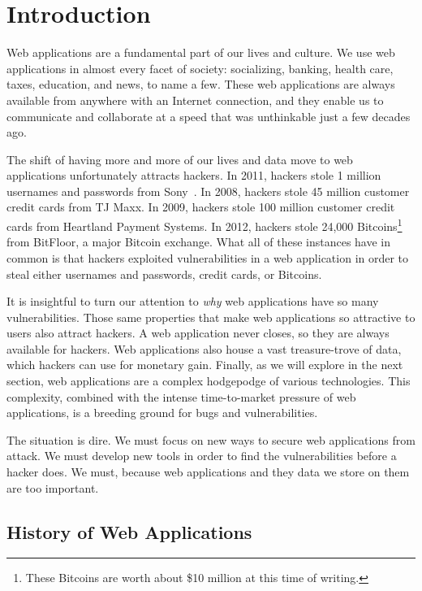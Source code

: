 %
%

\chapter{Introduction}

Web applications are a fundamental part of our lives and culture. We
use web applications in almost every facet of society: socializing,
banking, health care, taxes, education, and news, to name a few. These
web applications are always available from anywhere with an Internet
connection, and they enable us to communicate and collaborate at a
speed that was unthinkable just a few decades ago.

The shift of having more and more of our lives and data move to web
applications unfortunately attracts hackers. In 2011, hackers stole 1
million usernames and passwords from Sony~\cite{bilton11:sony}. In
2008, hackers stole 45 million customer credit cards from TJ Maxx. In
2009, hackers stole 100 million customer credit cards from Heartland
Payment Systems. In 2012, hackers stole 24,000 Bitcoins\footnote{These
  Bitcoins are worth about \$10 million at this time of writing.} from
BitFloor, a major Bitcoin exchange. What all of these instances have
in common is that hackers exploited vulnerabilities in a web
application in order to steal either usernames and passwords, credit
cards, or Bitcoins.

It is insightful to turn our attention to \emph{why} web applications
have so many vulnerabilities. Those same properties that make web
applications so attractive to users also attract hackers. A web
application never closes, so they are always available for hackers.
Web applications also house a vast treasure-trove of data, which
hackers can use for monetary gain. Finally, as we will explore in the
next section, web applications are a complex hodgepodge of various
technologies. This complexity, combined with the intense
time-to-market pressure of web applications, is a breeding ground for
bugs and vulnerabilities.

The situation is dire. We must focus on new ways to secure web
applications from attack. We must develop new tools in order to find
the vulnerabilities before a hacker does. We must, because web
applications and they data we store on them are too important.

\section{History of Web Applications}

